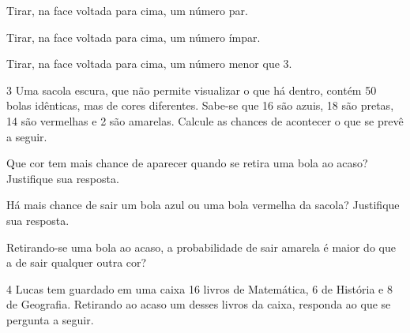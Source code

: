 \begin{escolha}
\item
  Tirar, na face voltada para cima, um número par.

\item
  Tirar, na face voltada para cima, um número ímpar.

\item
  Tirar, na face voltada para cima, um número menor que 3.
\end{escolha}


\num{3} Uma sacola escura, que não permite visualizar o que há dentro, contém
50 bolas idênticas, mas de cores diferentes. Sabe-se que 16 são azuis,
18 são pretas, 14 são vermelhas e 2 são amarelas. Calcule as chances de
acontecer o que se prevê a seguir.

\begin{escolha}
\item   Que cor tem mais chance de aparecer quando se retira uma bola ao acaso? Justifique sua resposta.

\item   Há mais chance de sair um bola azul ou uma bola vermelha da sacola? Justifique sua resposta.

\item  Retirando-se uma bola ao acaso, a probabilidade de sair amarela é maior do que a de sair qualquer outra cor?
\end{escolha}


\num{4} Lucas tem guardado em uma caixa 16 livros de Matemática, 6 de História e
8 de Geografia. Retirando ao acaso um desses livros da caixa, responda ao que se pergunta a seguir.

